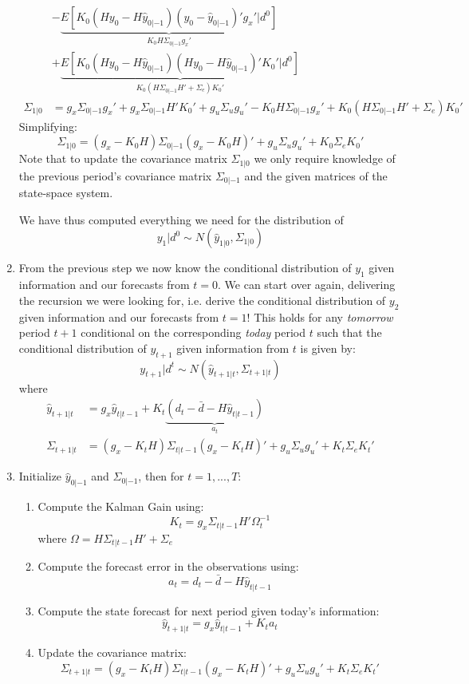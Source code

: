 \begin{enumerate}
\begin{align*}
			\\
			&- \underbrace{E\left[K_0 (H y_0  - H\hat{y}_{0|-1})(y_0-\hat{y}_{0|-1})'g_x'|d^0 \right]}_{K_0 H \Sigma_{0|-1}g_x'}
			\\
	        &+ \underbrace{E\left[K_0 (H y_0  - H\hat{y}_{0|-1})(H y_0 - H\hat{y}_{0|-1})' K_0'|d^0 \right]}_{K_0(H\Sigma_{0|-1}H' + \Sigma_e)K_0'}
			\\
			\Sigma_{1|0}&=g_x \Sigma_{0|-1}g_x' + g_x \Sigma_{0|-1}H'K_0' + g_u \Sigma_u g_u' - K_0 H \Sigma_{0|-1}g_x' + K_0(H\Sigma_{0|-1}H' + \Sigma_e)K_0'
		\end{align*}	
		Simplifying:
		$$\Sigma_{1|0} = (g_x - K_0 H) \Sigma_{0|-1} (g_x - K_0 H)' + g_u \Sigma_u g_u' + K_0 \Sigma_e K_0'$$
		Note that to update the covariance matrix $\Sigma_{1|0}$ we only require knowledge of the previous period's covariance matrix $\Sigma_{0|-1}$ and the given matrices of the state-space system.
		
		We have thus computed everything we need for the distribution of 
		$$y_1|d^0 \sim N(\hat{y}_{1|0},\Sigma_{1|0})$$

		\item From the previous step we now know the conditional distribution of $y_1$ given information and our forecasts from $t=0$. We can start over again, delivering the recursion we were looking for, i.e. derive the conditional distribution of $y_2$ given information and our forecasts from $t=1$! This holds for any \emph{tomorrow} period $t+1$ conditional on the corresponding \emph{today} period $t$ such that the conditional distribution of $y_{t+1}$ given information from $t$ is given by:
		$$y_{t+1}|d^t \sim N(\hat{y}_{t+1|t},\Sigma_{t+1|t})$$
		where
		\begin{align*}
			\hat{y}_{t+1|t} &= g_x \hat{y}_{t|t-1} + K_t \underbrace{\left(d_t-\bar{d} - H\hat{y}_{t|t-1}\right)}_{a_t}
			\\
			\Sigma_{t+1|t} &= (g_x - K_t H) \Sigma_{t|t-1} (g_x - K_t H)' + g_u \Sigma_u g_u' + K_t \Sigma_e K_t'				
		\end{align*}
		
		\item Initialize $\hat{y}_{0|-1}$ and $\Sigma_{0|-1}$, then for $t=1,...,T$:
		\begin{enumerate}
			\item Compute the Kalman Gain using: $$K_t = g_x \Sigma_{t|t-1} H' \Omega_t^{-1}$$ where $\Omega=H \Sigma_{t|t-1} H' + \Sigma_e$		
			\item Compute the forecast error in the observations using: $$a_t=d_t - \bar{d} - H \hat{y}_{t|t-1}$$		
			\item Compute the state forecast for next period given today's information: $$\hat{y}_{t+1|t} = g_x \hat{y}_{t|t-1} + K_t a_t$$
			\item Update the covariance matrix: $$\Sigma_{t+1|t} = (g_x - K_t H) \Sigma_{t|t-1} (g_x - K_t H)' + g_u \Sigma_u g_u' + K_t \Sigma_e K_t'$$		
		\end{enumerate}


\end{enumerate}
